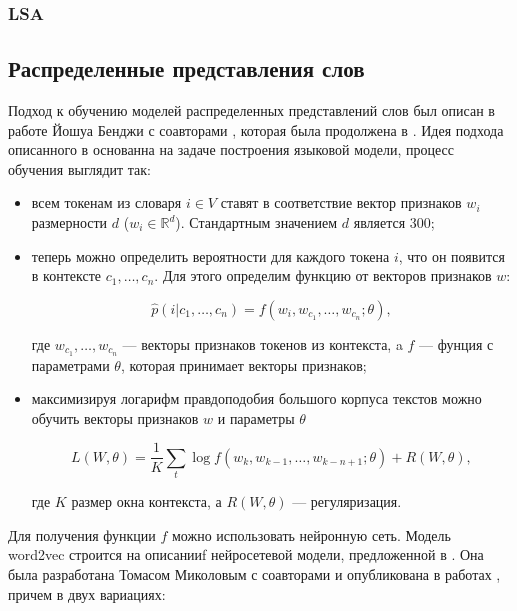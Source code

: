 \subsubsection{LSA}


\subsection{Распределенные представления слов}

Подход к обучению моделей распределенных представлений слов был описан в работе Йошуа Бенджи с соавторами \cite{Bengio}, которая была продолжена в \cite{Zhou}. Идея подхода описанного в \cite{Bengio} основанна на задаче построения языковой модели, процесс обучения выглядит так:

\bigskip
\begin{itemize}
 \item всем токенам из словаря $i \in V$ ставят в соответствие вектор признаков $w_i$ размерности $d$ ($w_i \in \mathds{R}^d$). Стандартным значением $d$ является 300;

 \item теперь можно определить вероятности для каждого токена $i$, что он появится в контексте $c_1, \ldots, c_n$. Для этого определим функцию от векторов признаков $w$:

 \begin{equation}
  \hat{p}(i|c_1, \ldots, c_n) = f(w_i, w_{c_1}, \ldots, w_{c_n}; \theta),
 \end{equation}

 где $w_{c_1}, \ldots, w_{c_n}$ --- векторы признаков токенов из контекста, a $f$ --- фунция с параметрами $\theta$, которая принимает векторы признаков;

 \item максимизируя логарифм правдоподобия большого корпуса текстов можно обучить векторы признаков $w$ и параметры $\theta$

 \begin{equation}
  L(W, \theta) = \frac{1}{K}\sum_t \log{f(w_k, w_{k-1}, \ldots, w_{k-n+1}; \theta) + R(W, \theta)},
 \end{equation}

 где $K$ размер окна контекста, а $R(W, \theta)$ --- регуляризация.

\end{itemize}

\bigskip
Для получения функции $f$ можно использовать нейронную сеть. Модель word2vec строится на описанииf нейросетевой модели, предложенной в \cite{Bengio}. Она была разработана Томасом Миколовым с соавторами и опубликована в работах \cite{Mikolov:1, Mikolov:2}, причем в двух вариациях:

